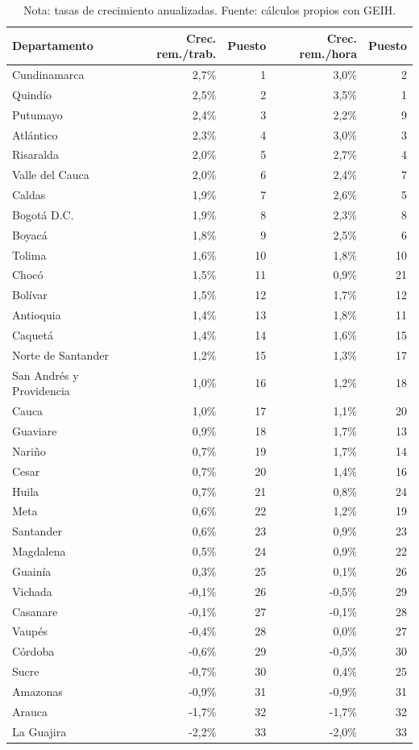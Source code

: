 \begin{table}[H]
\centering
\caption{Crecimiento de la remuneración laboral por departamento, 2014--2025}
\label{tab:dept_remuneracion_crecimientos_33}
\scriptsize
\begin{tabular}{lrrrr}
\toprule
Departamento & Crec. rem./trab. & Puesto & Crec. rem./hora & Puesto \\
\midrule
Cundinamarca & 2,7\% & 1 & 3,0\% & 2 \\
Quindío & 2,5\% & 2 & 3,5\% & 1 \\
Putumayo & 2,4\% & 3 & 2,2\% & 9 \\
Atlántico & 2,3\% & 4 & 3,0\% & 3 \\
Risaralda & 2,0\% & 5 & 2,7\% & 4 \\
Valle del Cauca & 2,0\% & 6 & 2,4\% & 7 \\
Caldas & 1,9\% & 7 & 2,6\% & 5 \\
Bogotá D.C. & 1,9\% & 8 & 2,3\% & 8 \\
Boyacá & 1,8\% & 9 & 2,5\% & 6 \\
Tolima & 1,6\% & 10 & 1,8\% & 10 \\
Chocó & 1,5\% & 11 & 0,9\% & 21 \\
Bolívar & 1,5\% & 12 & 1,7\% & 12 \\
Antioquia & 1,4\% & 13 & 1,8\% & 11 \\
Caquetá & 1,4\% & 14 & 1,6\% & 15 \\
Norte de Santander & 1,2\% & 15 & 1,3\% & 17 \\
San Andrés y Providencia & 1,0\% & 16 & 1,2\% & 18 \\
Cauca & 1,0\% & 17 & 1,1\% & 20 \\
Guaviare & 0,9\% & 18 & 1,7\% & 13 \\
Nariño & 0,7\% & 19 & 1,7\% & 14 \\
Cesar & 0,7\% & 20 & 1,4\% & 16 \\
Huila & 0,7\% & 21 & 0,8\% & 24 \\
Meta & 0,6\% & 22 & 1,2\% & 19 \\
Santander & 0,6\% & 23 & 0,9\% & 23 \\
Magdalena & 0,5\% & 24 & 0,9\% & 22 \\
Guainía & 0,3\% & 25 & 0,1\% & 26 \\
Vichada & -0,1\% & 26 & -0,5\% & 29 \\
Casanare & -0,1\% & 27 & -0,1\% & 28 \\
Vaupés & -0,4\% & 28 & 0,0\% & 27 \\
Córdoba & -0,6\% & 29 & -0,5\% & 30 \\
Sucre & -0,7\% & 30 & 0,4\% & 25 \\
Amazonas & -0,9\% & 31 & -0,9\% & 31 \\
Arauca & -1,7\% & 32 & -1,7\% & 32 \\
La Guajira & -2,2\% & 33 & -2,0\% & 33 \\
\bottomrule
\end{tabular}
\caption*{\footnotesize Nota: tasas de crecimiento anualizadas. Fuente: cálculos propios con GEIH.}
\end{table}